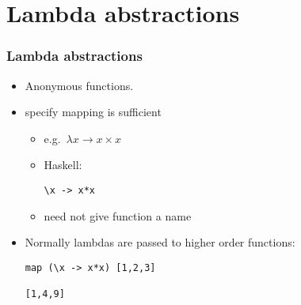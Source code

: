 \section{Lambda abstractions}

\begin{frame}[fragile]
  \frametitle{Lambda abstractions}
  \begin{itemize}
    \item Anonymous functions.
    \item specify mapping is sufficient
      \begin{itemize}
        \item e.g.\ $\lambda x \rightarrow x \times x$
        \item Haskell:
\begin{lstlisting}
\x -> x*x
\end{lstlisting}
        \item need not give function a name
      \end{itemize}
    \item Normally lambdas are passed to higher order functions:
\begin{lstlisting}
map (\x -> x*x) [1,2,3]

[1,4,9]
\end{lstlisting}
  \end{itemize}
  
\end{frame}